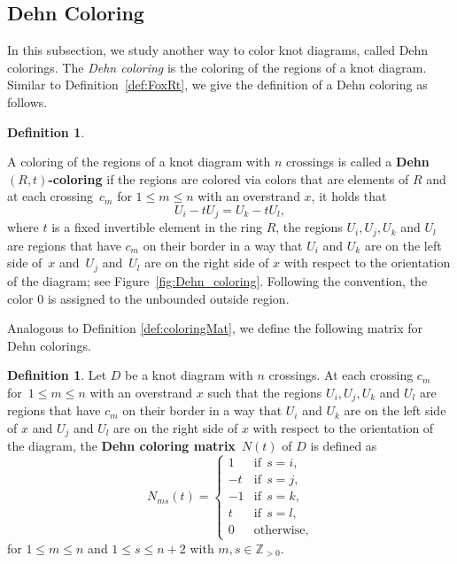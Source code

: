 \documentclass[11pt,a4paper]{article}
\theoremstyle{definition}
\newtheorem{definition}[theorem]{Definition}
\newcommand{\numberset}{\mathbb}
\newcommand{\Z}{\numberset{Z}}
\begin{document}
\subsection{Dehn Coloring}

In this subsection, we study another way to color knot diagrams, called Dehn colorings. The \textit{Dehn coloring} is the coloring of the regions of a knot diagram. Similar to Definition~\ref{def:FoxRt}, we give the definition of a Dehn coloring as follows. 

\begin{definition}
\label{def:DehnRt}

A coloring of the regions of a knot diagram with $n$ crossings is called a \textbf{Dehn $(R,t)$-coloring} 
if the regions are colored via colors that are elements of $R$ 
and at each crossing~$c_m$ for $1 \le m \le n$ with an overstrand $x$, it holds that
\begin{equation*}
U_i - tU_j = U_k - tU_l,
\end{equation*}
where $t$ is a fixed invertible element in the ring $R$, the regions $U_i,U_j,U_k$ and $U_l$ are regions that have $c_m$ on their border in a way that $U_i$ and $U_k$ are on the left side of~$x$ and~$U_j$ and~$U_l$ are on the right side of $x$ with respect to the orientation of the diagram; see Figure~\ref{fig:Dehn_coloring}. Following the convention, the color $0$ is assigned to the unbounded outside region. 
\end{definition}


Analogous to Definition \ref{def:coloringMat}, we define the following matrix for Dehn colorings.

\begin{definition}
\label{def:DehnMat}
Let $D$ be a knot diagram with $n$ crossings. At each crossing $c_m$ for~$1 \le m \le n$ with an overstrand $x$ such that the regions $U_i,U_j,U_k$ and $U_l$ are regions that have $c_m$ on their border in a way that $U_i$ and $U_k$ are on the left side of $x$ and $U_j$ and $U_l$ are on the right side of $x$ with respect to the orientation of the diagram, the \textbf{Dehn coloring matrix}~$N(t)$ of $D$ is defined as
$$
N_{ms}(t) = 
\begin{cases}
1 & \text{if} \ \ s=i,\\
-t & \text{if} \ \ s=j,\\
-1 & \text{if} \ \ s=k,\\
t & \text{if} \ \  s=l,\\
0 & \text{otherwise},
\end{cases}
$$ for $1 \le m \le n$ and $1 \le s \le n+2$ with $m,s \in \Z_{>0}.$
\end{definition}
\end{document}
